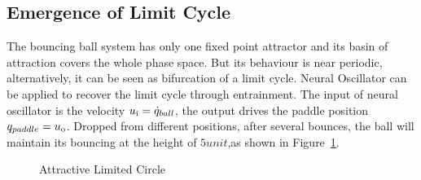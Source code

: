 \subsection*{Emergence of Limit Cycle}
The  bouncing ball system has only one fixed point attractor and its basin of attraction covers the whole phase space.
But its behaviour is near periodic, alternatively, it can be seen as bifurcation of a limit cycle.
Neural Oscillator can be applied to recover the limit cycle through entrainment.
The input of neural oscillator is the velocity $u_{\mathrm{i}}=\dot{q}_{ball}$, the output drives the paddle position $q_{paddle}=u_{\mathrm{o}}$.
Dropped from different positions, after several bounces, the ball will maintain its bouncing at the height of $5 unit$,as shown in Figure~\ref{fig:bb_attractive_circle}.

\begin{figure}[h]
\begin{center}
	
\end{center}
\caption{Attractive Limited Circle}
\label{fig:bb_attractive_circle}
\end{figure}

